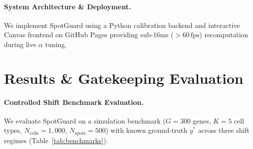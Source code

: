 \documentclass[pmlr,twocolumn,10pt]{jmlr}
\newcommand{\simplex}{\Delta^{K-1}}
\begin{document}
\paragraph{System Architecture \& Deployment.}
We implement SpotGuard using a Python calibration backend and interactive Canvas frontend on GitHub Pages providing sub-16ms ($>60\,\text{fps}$) recomputation during live $\alpha$ tuning.

\section{Results \& Gatekeeping Evaluation}
\label{sec:results}

\paragraph{Controlled Shift Benchmark Evaluation.}
We evaluate SpotGuard on a simulation benchmark ($G=300$ genes, $K=5$ cell types, $N_{\text{cells}}=1{,}000$, $N_{\text{spots}}=500$) with known ground-truth $y^*$ across three shift regimes (Table~\ref{tab:benchmarks}).

\begin{table}[t]
\centering
\small
\renewcommand{\arraystretch}{1.35}
\setlength{\tabcolsep}{3.2pt}
\caption{\textbf{Empirical Coverage, Efficiency, \& Gatekeeping at Nominal 90\% ($\alpha = 0.10$).} $\mathcal{V}$ denotes mean TV ball radius $\hat{q}_\alpha$ on $\simplex$. Retained MAE is mean TV error on unmasked spots. Mask\% is the fraction of gated spots.}
\label{tab:benchmarks}
\vspace{-2pt}
\end{table}
\end{document}
